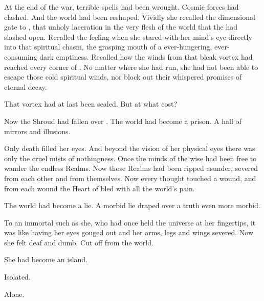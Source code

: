 

At the end of the war, terrible spells had been wrought. 
Cosmic forces had clashed. 
And the world had been reshaped. 
Vividly she recalled the dimensional gate to , that unholy laceration in the very flesh of the world that the \resphain{} had slashed open. 
Recalled the feeling when she stared with her mind's eye directly into that spiritual chasm, the grasping mouth of a ever-hungering, ever-consuming dark emptiness. 
Recalled how the winds from that bleak vortex had reached every corner of \Miith{}.
No matter where she had run, she had not been able to escape those cold spiritual winds, nor block out their whispered promises of eternal decay. 

That vortex had at last been sealed. 
But at what cost? 

Now the Shroud had fallen over \Miith{}. 
The world had become a prison. 
A hall of mirrors and illusions. 

Only death filled her eyes. 
And beyond the vision of her physical eyes there was only the cruel mists of nothingness. 
Once the minds of the wise had been free to wander the endless Realms. 
Now those Realms had been ripped asunder, severed from each other and from themselves. 
Now every thought touched a wound, and from each wound the Heart of \Miith{} bled with all the world's pain. 

The world had become a lie. 
A morbid lie draped over a truth even more morbid. 

To an immortal such as she, who had once held the universe at her fingertips, it was like having her eyes gouged out and her arms, legs and wings severed. 
Now she felt deaf and dumb. 
Cut off from the world. 

She had become an island. 

Isolated. 

Alone. 

\begin{comment}
\section{\Secherdamon}
\end{comment}

